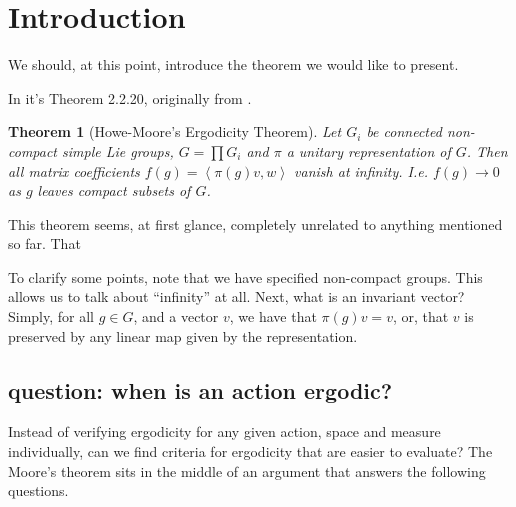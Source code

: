 \documentclass[
  12pt
]{article}
\theoremstyle{break}
\newtheorem{thm}{Theorem}
\theoremstyle{plain}
\newcommand{\G}{\ensuremath{G}\xspace}
\newcommand{\inn}[1]{\left\langle #1 \right\rangle}
\begin{document}






\hypertarget{introduction}{\section{Introduction}\label{sec:introduction}}

  We should, at this point, introduce the theorem we would like to present.

    In \cite{Zimmer84} it's Theorem 2.2.20, originally from \cite{howe79}.
  \begin{thm}[Howe-Moore's Ergodicity Theorem]
    \label{thm:main-thm}
    Let $G_i$ be connected non-compact simple Lie groups, $G = \prod G_i$ and $\pi$ a unitary representation of \G .
    Then all matrix coefficients $f(g) = \inn{\pi(g)v,w}$ vanish at infinity. I.e. $f(g) \rightarrow 0$ as $g$ leaves compact subsets of \G.
  \end{thm}

  This theorem seems, at first glance, completely unrelated to anything mentioned so far.
  That 

  To clarify some points, note that we have specified non-compact groups.
  This allows us to talk about ``infinity'' at all. Next, what is an
  invariant vector? Simply, for all $g\in G$, and a vector $v$, we
  have that $\pi(g)v = v$, or, that $v$ is preserved by any linear map
  given by the representation.

  \hypertarget{question-when-is-an-action-ergodic}{%
  \subsection{question: when is an action
  ergodic?}\label{question-when-is-an-action-ergodic}}

  Instead of verifying ergodicity for any given action, space and measure
  individually, can we find criteria for ergodicity that are easier to
  evaluate? The Moore's theorem sits in the middle of an argument that
  answers the following questions.

\end{document}
